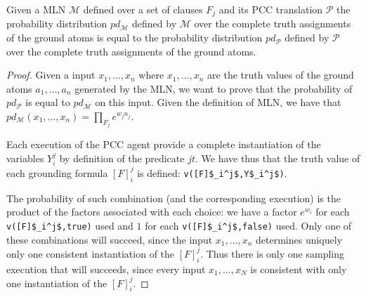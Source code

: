 \begin{theorem}
Given a MLN $\mathcal{M}$ defined over a set of clauses $F_j$ and its PCC translation $\mathcal{P}$ 
the probability distribution $pd_{\mathcal{M}}$ defined by $\mathcal{M}$ over the complete truth assignments of the ground atoms  is equal to the probability distribution $pd_{\mathcal{P}}$ defined by $\mathcal{P}$ over the complete truth assignments of the ground atoms.
\end{theorem}
\begin{proof}
Given a input $x_1, \ldots ,x_n$ where $x_1, \ldots , x_n$ are the truth values of the ground atoms $a_1,\ldots, a_n$ generated by the MLN, we want to prove that the probability of $pd_{\mathcal{P}}$ is equal to $pd_{\mathcal{M}}$ on this input. Given the definition of MLN, we have that $pd_{\mathcal{M}}(x_1, \ldots ,x_n)=\prod_{F_j} e^{w_j n_j}$.

Each execution of the PCC agent provide a complete instantiation of the variables $Y_i^j$ by definition of the predicate $jt$. We have thus that the truth value of each grounding formula $[F]_i^j$ is defined: \lstinline[mathescape=true]{v([F]$_i^j$,Y$_i^j$)}. 

The probability of such combination (and the corresponding execution) is the product of the factors associated with each choice: we have a factor $e^{w_i}$ for each \lstinline[mathescape=true]{v([F]$_i^j$,true)} used and $1$ for each \lstinline[mathescape=true]{v([F]$_i^j$,false)} used. Only one of these combinations will succeed, since the input $x_1, \ldots ,x_n$ determines uniquely only one consistent instantiation of the $[F]_i^j$. 
Thus there is only one sampling execution that will succeeds, since every input $x_1,\ldots,x_N$ is consistent with only one instantiation of the $[F]_i^j$.
\end{proof}


